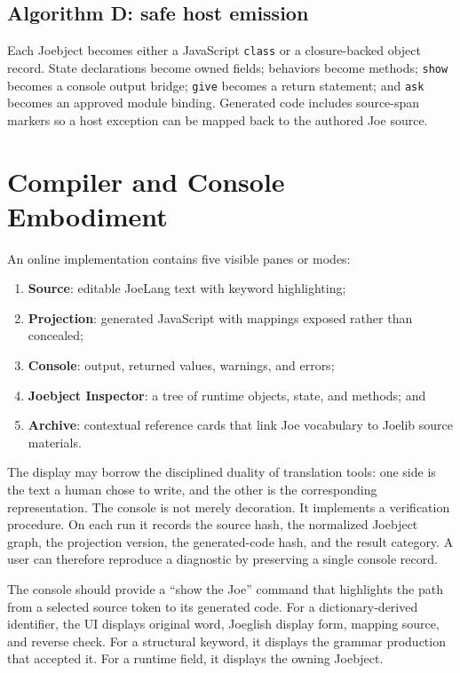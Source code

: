 \documentclass[12pt]{article}
\newcommand{\term}[1]{\textbf{#1}}
\begin{document}
\subsection{Algorithm D: safe host emission}
Each Joebject becomes either a JavaScript \texttt{class} or a closure-backed object record. State declarations become owned fields; behaviors become methods; \texttt{show} becomes a console output bridge; \texttt{give} becomes a return statement; and \texttt{ask} becomes an approved module binding. Generated code includes source-span markers so a host exception can be mapped back to the authored Joe source.

\clearpage
\section{Compiler and Console Embodiment}
An online implementation contains five visible panes or modes:
\begin{enumerate}
  \item \term{Source}: editable JoeLang text with keyword highlighting;
  \item \term{Projection}: generated JavaScript with mappings exposed rather than concealed;
  \item \term{Console}: output, returned values, warnings, and errors;
  \item \term{Joebject Inspector}: a tree of runtime objects, state, and methods; and
  \item \term{Archive}: contextual reference cards that link Joe vocabulary to Joelib source materials.
\end{enumerate}

The display may borrow the disciplined duality of translation tools: one side is the text a human chose to write, and the other is the corresponding representation. The console is not merely decoration. It implements a verification procedure. On each run it records the source hash, the normalized Joebject graph, the projection version, the generated-code hash, and the result category. A user can therefore reproduce a diagnostic by preserving a single console record.

The console should provide a ``show the Joe'' command that highlights the path from a selected source token to its generated code. For a dictionary-derived identifier, the UI displays original word, Joeglish display form, mapping source, and reverse check. For a structural keyword, it displays the grammar production that accepted it. For a runtime field, it displays the owning Joebject.
\end{document}
